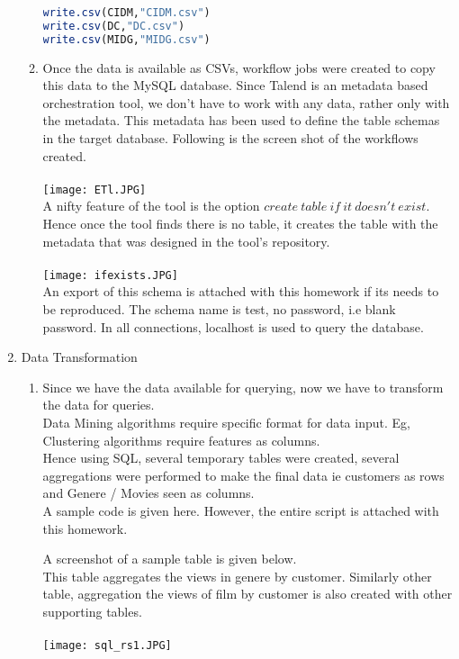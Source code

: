 \documentclass{article}
\begin{document}
\begin{enumerate}
\begin{enumerate}
\begin{lstlisting}[language=R]
write.csv(CIDM,"CIDM.csv")
write.csv(DC,"DC.csv")
write.csv(MIDG,"MIDG.csv")
\end{lstlisting}
\item Once the data is available as CSVs, workflow jobs were created to copy this data to the MySQL database.
Since Talend is an metadata based orchestration tool, we don't have to work with any data, rather only with the metadata.
This metadata has been used to define the table schemas in the target database. Following is the screen shot of the workflows created.\\ \\
\texttt{[image: ETl.JPG]}\\
A nifty feature of the tool is the option $create \: table \: if \: it \: doesn't \: exist$. Hence once the tool finds there is no table, it creates the table with the metadata that was designed in the tool's repository.\\ \\
\texttt{[image: ifexists.JPG]}\\
An export of this schema is attached with this homework if its needs to be reproduced.
The schema name is test, no password, i.e blank password. In all connections, localhost is used to query the database.
\end{enumerate}
\item Data Transformation
\begin{enumerate}
\item Since we have the data available for querying, now we have to transform the data for queries.\\
Data Mining algorithms require specific format for data input. Eg, Clustering algorithms require features as columns.\\
Hence using SQL, several temporary tables were created, several aggregations were performed to make the final data ie customers as rows and Genere / Movies seen as columns.\\
A sample code is given here. However, the entire script is attached with this homework.

A screenshot of a sample table is given below.\\
This table aggregates the views in genere by customer. Similarly other table, aggregation the views of film by customer is also created with other supporting tables.\\ \\
\texttt{[image: sql\_rs1.JPG]}\\
\end{enumerate}
\end{enumerate}
\end{document}

